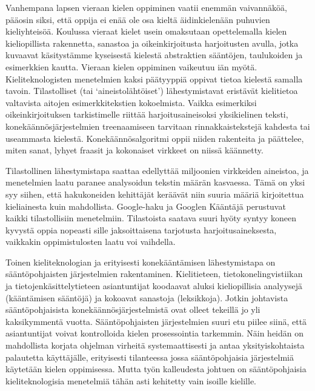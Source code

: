 \begin{multicols}{2}
Vanhempana lapsen vieraan kielen oppiminen vaatii enemmän vaivannäköä, pääosin siksi, että oppija ei enää ole osa kieltä äidinkielenään puhuvien kieliyhteisöä.  Koulussa vieraat kielet usein omaksutaan opettelemalla kielen kieliopillista rakennetta, sanastoa ja oikeinkirjoitusta harjoitusten avulla, jotka kuvaavat käsitystämme kyseisestä kielestä abstraktien sääntöjen, taulukoiden ja esimerkkien kautta. Vieraan kielen oppiminen vaikeutuu iän myötä.  Kieliteknologisten menetelmien kaksi päätyyppiä oppivat tietoa kielestä samalla tavoin. Tilastolliset (tai ‘aineistolähtöiset’) lähestymistavat eristävät kielitietoa valtavista aitojen esimerkkitekstien kokoelmista. Vaikka esimerkiksi oikeinkirjoituksen tarkistimelle riittää harjoitusaineisoksi yksikielinen teksti, konekäännösjärjestelmien treenaamiseen tarvitaan rinnakkaistekstejä kahdesta tai useammasta kielestä. Konekäännösalgoritmi oppii niiden rakenteita ja päättelee, miten sanat, lyhyet fraasit ja kokonaiset virkkeet on niissä käännetty.


Tilastollinen lähestymistapa saattaa edellyttää miljoonien virkkeiden aineistoa, ja menetelmien laatu paranee analysoidun tekstin määrän kasvaessa.  Tämä on yksi syy siihen, että hakukoneiden kehittäjät keräävät niin suuria määriä kirjoitettua kieliainesta kuin mahdollista. Google-haku ja Googlen Kääntäjä perustuvat kaikki tilastollisiin menetelmiin. Tilastoista saatava suuri hyöty syntyy koneen kyvystä oppia nopeasti sille jaksoittaisena tarjotusta harjoitusaineksesta, vaikkakin oppimistulosten laatu voi vaihdella.

Toinen kieliteknologian ja erityisesti konekääntämisen lähestymistapa on sääntöpohjaisten järjestelmien rakentaminen. Kielitieteen, tietokonelingvistiikan ja tietojenkäsittelytieteen asiantuntijat koodaavat aluksi kieliopillisia analyysejä (kääntämisen sääntöjä) ja kokoavat sanastoja (leksikkoja). Jotkin johtavista sääntöpohjaisista konekäännösjärjestelmistä ovat olleet tekeillä jo yli kaksikymmentä vuotta. Sääntöpohjaisten järjestelmien suuri etu piilee siinä, että asiantuntijat voivat kontrolloida kielen prosessointia tarkemmin. Näin heidän on mahdollista korjata ohjelman virheitä systemaattisesti ja antaa yksityiskohtaista palautetta käyttäjälle, erityisesti tilanteessa jossa sääntöpohjaisia järjestelmiä käytetään kielen oppimisessa. Mutta työn kalleudesta johtuen on sääntöpohjaisia kieliteknologisia menetelmiä tähän asti kehitetty vain isoille kielille.


\end{multicols}
